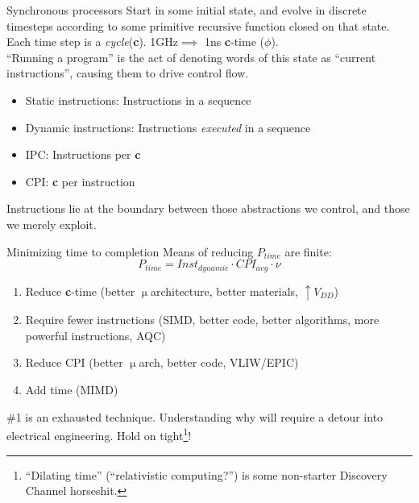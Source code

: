\documentclass[mathserif,xcolor={dvipsnames,table}]{beamer}
\begin{document}
\begin{frame}{Synchronous processors}
Start in some initial state, and evolve in discrete timesteps
according to some primitive recursive function closed on that state.\\
\vspace{.15in}
Each time step is a \textit{cycle}(\textbf{c}). 1GHz$\implies$ 1ns \textbf{c}-time ($\phi$).\\
\vspace{.15in}
``Running a program'' is the act of denoting words of this state
as ``current instructions'', causing them to drive control flow.
\vspace{.15in}
\begin{itemize}
\item Static instructions: Instructions in a sequence
\item Dynamic instructions: Instructions \textit{executed} in a sequence
\item IPC: Instructions per \textbf{c}
\item CPI: \textbf{c} per instruction
\end{itemize}
\vspace{.15in}
Instructions lie at the boundary between those abstractions we control, and those
we merely exploit.%
\end{frame}

\begin{frame}{Minimizing time to completion}
Means of reducing $P_{time}$ are finite:
\begin{equation}
P_{time} = Inst_{dynamic}\cdot CPI_{avg}\cdot\nu
\end{equation}
\begin{enumerate}
\item Reduce \textbf{c}-time (better $\upmu$architecture, better materials, $\uparrow V_{DD}$)
\item Require fewer instructions (SIMD, better code, better algorithms, more powerful instructions, AQC)
\item Reduce CPI (better $\upmu$arch, better code, VLIW/EPIC)
\item Add time (MIMD)
\end{enumerate}
\vspace{.25in}
\#1 is an exhausted technique. Understanding why will require a detour into
electrical engineering.
Hold on tight\footnote{\tiny{``Dilating time'' (``relativistic computing?'') is some
non-starter Discovery Channel horseshit.}}!
\end{frame}
\end{document}
